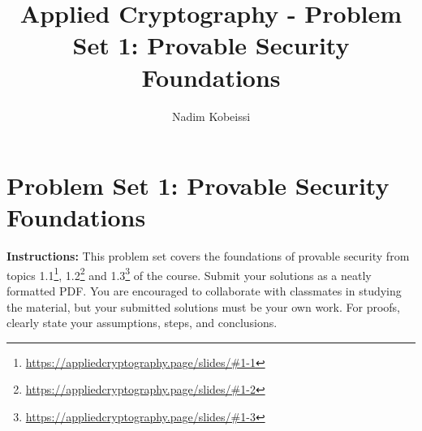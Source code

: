 \documentclass[10pt,a4paper,american]{exam}
\title{Applied Cryptography - Problem Set 1: Provable Security Foundations}
\author{Nadim Kobeissi}
\begin{document}
\classhandoutheader
\section*{Problem Set 1: Provable Security Foundations}

\begin{tcolorbox}[colframe=OliveGreen!30!white,colback=OliveGreen!5!white]
	\textbf{Instructions:} This problem set covers the foundations of provable security from topics 1.1\footnote{\url{https://appliedcryptography.page/slides/\#1-1}}, 1.2\footnote{\url{https://appliedcryptography.page/slides/\#1-2}} and 1.3\footnote{\url{https://appliedcryptography.page/slides/\#1-3}} of the course. Submit your solutions as a neatly formatted PDF. You are encouraged to collaborate with classmates in studying the material, but your submitted solutions must be your own work. For proofs, clearly state your assumptions, steps, and conclusions.
\end{tcolorbox}
\end{document}

